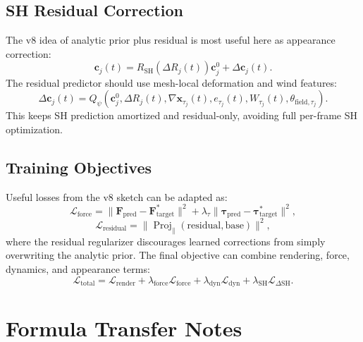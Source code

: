 \documentclass[11pt]{article}
\begin{document}
\subsection{SH Residual Correction}

The v8 idea of analytic prior plus residual is most useful here as appearance correction:
\[
  \mathbf{c}_j(t)
  =
  R_{\mathrm{SH}}\left(\Delta R_j(t)\right)\mathbf{c}_j^0
  +
  \Delta\mathbf{c}_j(t).
\]
The residual predictor should use mesh-local deformation and wind features:
\[
  \Delta\mathbf{c}_j(t)
  =
  Q_\psi
  \left(
    \mathbf{c}_j^0,
    \Delta R_j(t),
    \nabla\mathbf{x}_{\tau_j}(t),
    e_{\tau_j}(t),
    W_{\tau_j}(t),
    \theta_{\mathrm{field},\tau_j}
  \right).
\]
This keeps SH prediction amortized and residual-only, avoiding full per-frame SH optimization.

\subsection{Training Objectives}

Useful losses from the v8 sketch can be adapted as:
\[
  \mathcal{L}_{\mathrm{force}}
  =
  \|\mathbf{F}_{\mathrm{pred}}-\mathbf{F}_{\mathrm{target}}^\ast\|^2
  +
  \lambda_\tau
  \|\boldsymbol{\tau}_{\mathrm{pred}}-\boldsymbol{\tau}_{\mathrm{target}}^\ast\|^2,
\]
\[
  \mathcal{L}_{\mathrm{residual}}
  =
  \|\operatorname{Proj}_{\parallel}(\mathrm{residual},\mathrm{base})\|^2,
\]
where the residual regularizer discourages learned corrections from simply overwriting the analytic prior. The final objective can combine rendering, force, dynamics, and appearance terms:
\[
  \mathcal{L}_{\mathrm{total}}
  =
  \mathcal{L}_{\mathrm{render}}
  +
  \lambda_{\mathrm{force}}\mathcal{L}_{\mathrm{force}}
  +
  \lambda_{\mathrm{dyn}}\mathcal{L}_{\mathrm{dyn}}
  +
  \lambda_{\mathrm{SH}}\mathcal{L}_{\Delta \mathrm{SH}}.
\]

\section{Formula Transfer Notes}
\end{document}
